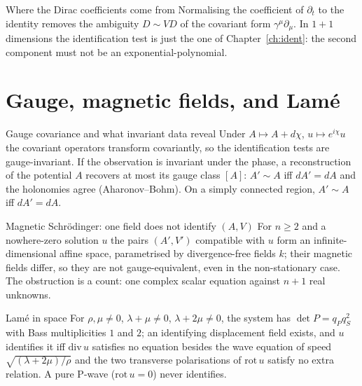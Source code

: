 \begin{example}{Where the Dirac coefficients come from}
Normalising the coefficient of $\partial_t$ to the identity removes the ambiguity $D\sim VD$ of the covariant form $\gamma^\mu\partial_\mu$. In $1+1$ dimensions the identification test is just the one of Chapter~\ref{ch:ident}: the second component must not be an exponential-polynomial.
\end{example}

\section{Gauge, magnetic fields, and Lam\'e}

\begin{proposition}{Gauge covariance and what invariant data reveal  \proved}\label{prop:gauge}
Under $A\mapsto A+d\chi$, $u\mapsto e^{i\chi}u$ the covariant operators transform covariantly, so the identification tests are gauge-invariant. If the observation is invariant under the phase, a reconstruction of the potential $A$ recovers at most its gauge class $[A]$: $A'\sim A$ iff $dA'=dA$ and the holonomies agree (Aharonov--Bohm). On a simply connected region, $A'\sim A$ iff $dA'=dA$.
\end{proposition}

\begin{proposition}{Magnetic Schr\"odinger: one field does not identify $(A,V)$  \proved}\label{prop:sysn3}
For $n\ge2$ and a nowhere-zero solution $u$ the pairs $(A',V')$ compatible with $u$ form an infinite-dimensional affine space, parametrised by divergence-free fields $k$; their magnetic fields differ, so they are not gauge-equivalent, even in the non-stationary case. The obstruction is a count: one complex scalar equation against $n+1$ real unknowns.
\end{proposition}

\begin{proposition}{Lam\'e in space  \proved}\label{prop:lame3}
For $\rho,\mu\ne0$, $\lambda+\mu\ne0$, $\lambda+2\mu\ne0$, the system has $\det P=q_Pq_S^2$ with Bass multiplicities $1$ and $2$; an identifying displacement field exists, and $u$ identifies it iff $\mathrm{div}\,u$ satisfies no equation besides the wave equation of speed $\sqrt{(\lambda+2\mu)/\rho}$ and the two transverse polarisations of $\mathrm{rot}\,u$ satisfy no extra relation. A pure P-wave ($\mathrm{rot}\,u=0$) never identifies.
\end{proposition}

